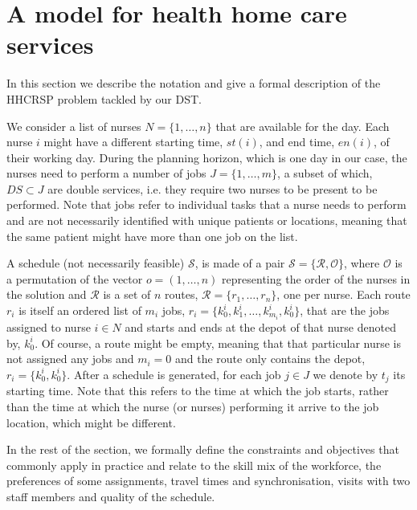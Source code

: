 \documentclass[a4paper,11pt,authoryear]{elsarticle}
\begin{document}
\section{A model for health home care services}
\label{sec:model}
\noindent In this section we describe the notation and give a formal description of the HHCRSP problem tackled by our DST.

We consider a list of nurses $N = \{1,\dots,n\}$ that are available for the day. Each nurse $i$ might have a different starting time, $st(i)$, and end time, $en(i)$, of their working day. During the planning horizon, which is one day in our case, the nurses need to perform a number of jobs $J = \{1,\dots,m\}$, a subset of which, $DS \subset J$ are double services, i.e. they require two nurses to be present to be performed. Note that jobs refer to individual tasks that a nurse needs to perform and are not necessarily identified with unique patients or locations, meaning that the same patient might have more than one job on the list.

A schedule (not necessarily feasible) $\mathcal{S}$, is made of a pair   $\mathcal{S} = \{\mathcal{R}, \mathcal{O}\}$, where $\mathcal{O}$ is a permutation of the vector $o = (1,\dots,n)$ representing the order of the nurses in the solution and $\mathcal{R}$ is a set of $n$ routes, $\mathcal{R} = \{r_1,\dots,r_n\}$, one per nurse. Each route $r_i$ is itself an ordered list of $m_i$ jobs, $r_i = \{k^i_0, k^i_1,\dots,k^i_{m_i}, k^i_0\}$, that are the jobs assigned to nurse $i \in N$ and starts and ends at the depot of that nurse denoted by, $k^i_0$. Of course, a route might be empty, meaning that that particular nurse is not assigned any jobs and $m_i = 0$ and the route only contains the depot, $r_i = \{k^i_0, k^i_0\}$.
After a schedule is generated, for each job $j \in J$ we denote by $t_j$ its starting time. Note that this refers to the time at which the job starts, rather than the time at which the nurse (or nurses) performing it arrive to the job location, which might be different.

In the rest of the section, we formally define the constraints and objectives that commonly apply in practice and relate to the skill mix of the workforce, the preferences of some assignments, travel times and synchronisation, visits with two staff members and quality of the schedule.

\end{document}
